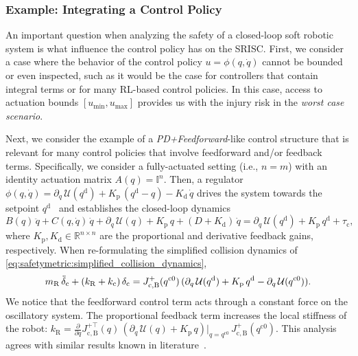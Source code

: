 \subsubsection{Example: Integrating a Control Policy}
An important question when analyzing the safety of a closed-loop soft robotic system is what influence the control policy has on the \gls{SRISC}.
First, we consider a case where the behavior of the control policy $u = \phi(q,\dot{q})$ cannot be bounded or even inspected, such as it would be the case for controllers that contain integral terms or for many RL-based control policies.
In this case, access to actuation bounds $[u_\mathrm{min}, u_\mathrm{max}]$ provides us with the injury risk in the \emph{worst case scenario}.

Next, we consider the example of a \emph{PD+Feedforward}-like control structure that is relevant for many control policies that involve feedforward and/or feedback terms.
Specifically, we consider a fully-actuated setting (i.e., $n=m$) with an identity actuation matrix $A(q) = \mathbb{I}^n$.
Then, a regulator $\phi(q,\dot{q}) = \partial_{q} \, \mathcal{U}( q^\mathrm{d}) + K_\mathrm{p} \, (q^\mathrm{d}-q) - K_\mathrm{d} \, \dot{q}$ drives the system towards the setpoint $q^\mathrm{d}$~\citep{della2023model} and establishes the closed-loop dynamics
\begin{equation}
    B(q) \, \ddot{q} + C(q, \dot{q}) \, \dot{q} + \partial_{q} \, \mathcal{U}(q) + K_\mathrm{p} \, q + (D+K_\mathrm{d}) \, \dot{q} = \partial_{q} \, \mathcal{U}( q^\mathrm{d}) + K_\mathrm{p} \, q^\mathrm{d} + \tau_\mathrm{c},
\end{equation}
where $K_\mathrm{p}, K_\mathrm{d} \in \mathbb{R}^{n \times n}$ are the proportional and derivative feedback gains, respectively.
When re-formulating the simplified collision dynamics of \eqref{eq:safetymetric:simplified_collision_dynamics}, 
\begin{equation}
    m_\mathrm{R} \, \Ddot{\delta}_\mathrm{c} + (k_\mathrm{R} + k_\mathrm{c}) \, \delta_\mathrm{c} = J_\mathrm{c,B}^{+}(q^{\mathrm{c}0}) \, (\partial_{q} \, \mathcal{U}(q^\mathrm{d}) +  K_\mathrm{p} \, q^\mathrm{d} - \partial_{q} \, \mathcal{U}(q^{\mathrm{c}0})).
\end{equation}
We notice that the feedforward control term acts through a constant force on the oscillatory system.
The proportional feedback term increases the local stiffness of the robot: $k_\mathrm{R} = \frac{\partial}{\partial q} J_\mathrm{c,B}^{+\top}(q) \, \left ( \partial_{q} \, \mathcal{U}(q) + K_\mathrm{p} \, q \right )\Big |_{q=q^{\mathrm{c}0}} \,  J_\mathrm{c,B}^{+}(q^{\mathrm{c}0})$.
This analysis agrees with similar results known in literature~\citep{della2017controlling}.

